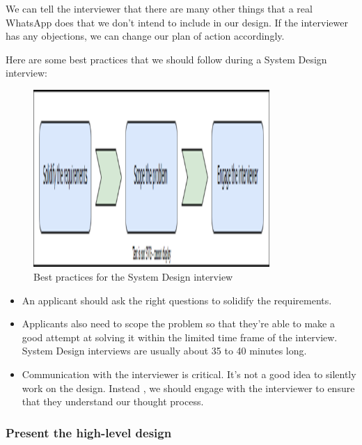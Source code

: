 We can tell the interviewer that there are many other things that a real WhatsApp does that we don't intend to include in our design. If the interviewer has any objections, we can change our plan of action accordingly.

Here are some best practices that we should follow during a System Design interview:

\begin{figure}[htbp]
 \centering
 \includegraphics[width=0.8\textwidth]{Images/chapter_1/section_4771234193080320/4537563495137280.png}
 \caption{Best practices for the System Design interview}
\end{figure}

\begin{itemize}
\item
{}\label{BkHabk7AURmxR6IR-ch_a}
An applicant should ask the right questions to solidify the requirements.
\item
{}\label{tMnQnmcrx93uB5IFGVFMX}
Applicants also need to scope the problem so that they're able to make a good attempt at solving it within the limited time frame of the interview. System Design interviews are usually about 35 to 40 minutes long.
\item
{}\label{CncjPzeO-3fVJ2QM2o_ip}
Communication with the interviewer is critical. It's not a good idea to silently work on the design. Instead , we should engage with the interviewer to ensure that they understand our thought process.
\end{itemize}

\subsubsection{Present the high-level design}\label{RwSzNg6izH6FhCXOl7kS4}

